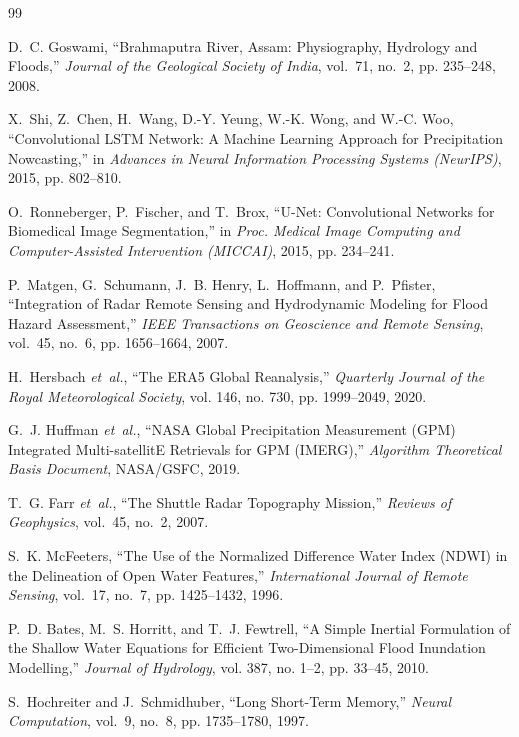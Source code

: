 \documentclass[12pt,a4paper,oneside]{report}
\begin{document}
\begin{thebibliography}{99}

D.~C. Goswami, ``Brahmaputra River, Assam: Physiography, Hydrology and Floods,'' \emph{Journal of the Geological Society of India}, vol.~71, no.~2, pp. 235--248, 2008.

X.~Shi, Z.~Chen, H.~Wang, D.-Y. Yeung, W.-K. Wong, and W.-C. Woo, ``Convolutional LSTM Network: A Machine Learning Approach for Precipitation Nowcasting,'' in \emph{Advances in Neural Information Processing Systems (NeurIPS)}, 2015, pp. 802--810.

O.~Ronneberger, P.~Fischer, and T.~Brox, ``U-Net: Convolutional Networks for Biomedical Image Segmentation,'' in \emph{Proc. Medical Image Computing and Computer-Assisted Intervention (MICCAI)}, 2015, pp. 234--241.

P.~Matgen, G.~Schumann, J.~B. Henry, L.~Hoffmann, and P.~Pfister, ``Integration of Radar Remote Sensing and Hydrodynamic Modeling for Flood Hazard Assessment,'' \emph{IEEE Transactions on Geoscience and Remote Sensing}, vol.~45, no.~6, pp. 1656--1664, 2007.

H.~Hersbach \emph{et~al.}, ``The ERA5 Global Reanalysis,'' \emph{Quarterly Journal of the Royal Meteorological Society}, vol. 146, no. 730, pp. 1999--2049, 2020.

G.~J. Huffman \emph{et~al.}, ``NASA Global Precipitation Measurement (GPM) Integrated Multi-satellitE Retrievals for GPM (IMERG),'' \emph{Algorithm Theoretical Basis Document}, NASA/GSFC, 2019.

T.~G. Farr \emph{et~al.}, ``The Shuttle Radar Topography Mission,'' \emph{Reviews of Geophysics}, vol.~45, no.~2, 2007.

S.~K. McFeeters, ``The Use of the Normalized Difference Water Index (NDWI) in the Delineation of Open Water Features,'' \emph{International Journal of Remote Sensing}, vol.~17, no.~7, pp. 1425--1432, 1996.

P.~D. Bates, M.~S. Horritt, and T.~J. Fewtrell, ``A Simple Inertial Formulation of the Shallow Water Equations for Efficient Two-Dimensional Flood Inundation Modelling,'' \emph{Journal of Hydrology}, vol. 387, no. 1--2, pp. 33--45, 2010.

S.~Hochreiter and J.~Schmidhuber, ``Long Short-Term Memory,'' \emph{Neural Computation}, vol.~9, no.~8, pp. 1735--1780, 1997.

\end{thebibliography}
\end{document}
